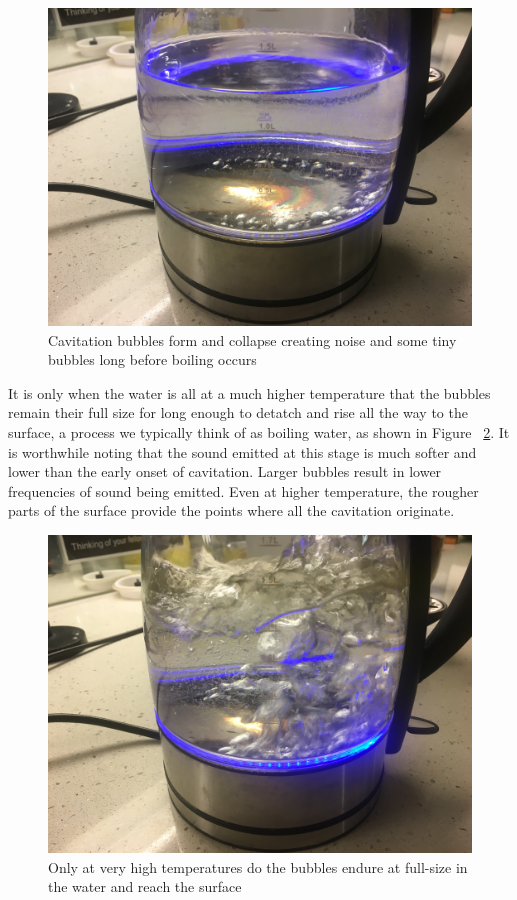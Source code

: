 \documentclass{article}\usepackage[]{graphicx}\usepackage[]{color}
\begin{document}
\begin{figure}
\includegraphics[width=\textwidth]{EarlyCavitation.JPG}
\caption{Cavitation bubbles form and collapse creating noise and some tiny bubbles long before boiling occurs}
\label{fig:EarlyCavitation.JPG}
\end{figure}

It is only when the water is all at a much higher temperature that the bubbles remain their full size for long enough to detatch and rise all the way to the surface, a process we typically think of as boiling water, as shown in Figure ~\ref{fig:BoilingCavitation.JPG}.  It is worthwhile noting that the sound emitted at this stage is much softer and lower than the early onset of cavitation. Larger bubbles result in lower frequencies of sound being emitted. Even at higher temperature, the rougher parts of the surface provide the points where all the cavitation originate.

\begin{figure}
\includegraphics[width=\textwidth]{BoilingCavitation.JPG}
\caption{Only at very high temperatures do the bubbles endure at full-size in the water and reach the surface}
\label{fig:BoilingCavitation.JPG}
\end{figure}
\end{document}
